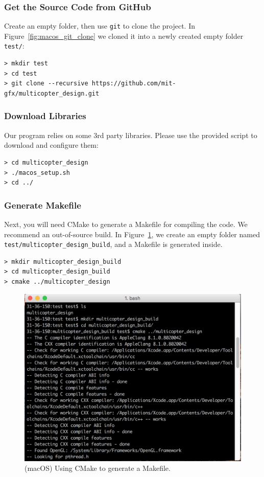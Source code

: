 \subsubsection{Get the Source Code from GitHub}
Create an empty folder, then use \texttt{git} to clone the project. In Figure~\ref{fig:macos_git_clone} we cloned it into a newly created empty folder \texttt{test/}:
\begin{verbatim}
> mkdir test
> cd test
> git clone --recursive https://github.com/mit-gfx/multicopter_design.git
\end{verbatim}

\subsubsection{Download Libraries}
Our program relies on some 3rd party libraries. Please use the provided script to download and configure them:
\begin{verbatim}
> cd multicopter_design
> ./macos_setup.sh
> cd ../
\end{verbatim}

\subsubsection{Generate Makefile}
Next, you will need CMake to generate a Makefile for compiling the code. We recommend an out-of-source build. In Figure~\ref{fig:macos_cmake_code_location}, we create an empty folder named \texttt{test/multicopter\_design\_build}, and a Makefile is generated inside.
\begin{verbatim}
> mkdir multicopter_design_build
> cd multicopter_design_build
> cmake ../multicopter_design
\end{verbatim}

\begin{figure}[!htb]
  \centering
  \includegraphics[width=0.75\linewidth]{macos_cmake_code_location}
  \caption{(macOS) Using CMake to generate a Makefile.}
  \label{fig:macos_cmake_code_location}
\end{figure}

